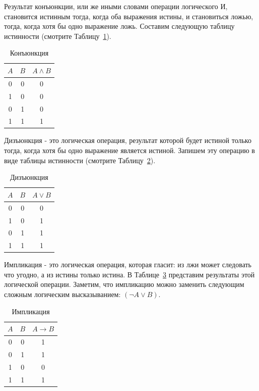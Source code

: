 Результат конъюнкции, или же иными словами операции логического И, становится истинным тогда, когда оба 
выражения истины, и становиться ложью, тогда, когда хотя бы одно выражение ложь. Составим следующую таблицу
истинности (смотрите Таблицу~\ref{tab:conjuction}). 

\begin{table}[!h]
\centering
\begin{tabular}{|c|c|c|}
\hline
$A$ & $B$ & $A \wedge B$ \\\hline
0   &  0  &  0 \\\hline
1   &  0  &  0 \\\hline
0   &  1  &  0 \\\hline
1   &  1  &  1 \\\hline
\end{tabular}
\caption{Конъюнкция}
\label{tab:conjuction}
\end{table}

Дизъюнкция - это логическая операция, результат которой будет истиной только тогда, когда
хотя бы одно выражение является истиной. Запишем эту операцию в виде таблицы истинности (смотрите
Таблицу~\ref{tab:disjunction}).

\begin{table}[!h]
\centering
\begin{tabular}{|c|c|c|}
\hline
$A$ & $B$ & $A \vee B$ \\\hline
0   &  0  &  0 \\\hline
1   &  0  &  1 \\\hline
0   &  1  &  1 \\\hline
1   &  1  &  1 \\\hline
\end{tabular}
\caption{Дизъюнкция}
\label{tab:disjunction}
\end{table}

Импликация - это логическая операция, которая гласит: из лжи может следовать что угодно, а
из истины только истина. В Таблице~\ref{tab:implication} представим результаты этой логической 
операции. Заметим, что импликацию можно заменить следующим сложным логическим 
высказыванием: $(\lnot A \vee B)$.

\begin{table}[!h]
\centering
\begin{tabular}{|c|c|c|}
\hline
$A$ & $B$ & $A \rightarrow B$ \\\hline
0   &  0  &  1 \\\hline
0   &  1  &  1 \\\hline
1   &  0  &  0 \\\hline
1   &  1  &  1 \\\hline
\end{tabular}
\caption{Импликация}
\label{tab:implication}
\end{table}

